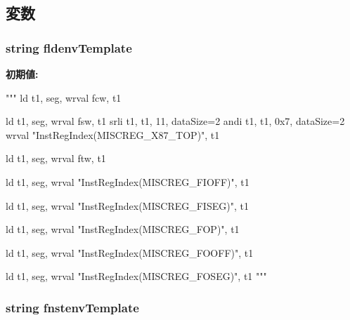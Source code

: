 \subsection{変数}
\hypertarget{namespaceinsts_1_1x87_1_1control_1_1save__and__restore__x87__environment_a644e1745a1988b0b33eaa88f57b12275}{
\subsubsection[{fldenvTemplate}]{\setlength{\rightskip}{0pt plus 5cm}string {\bf fldenvTemplate}}}
\label{namespaceinsts_1_1x87_1_1control_1_1save__and__restore__x87__environment_a644e1745a1988b0b33eaa88f57b12275}
{\bfseries 初期値:}
\begin{DoxyCode}
"""
    ld t1, seg, %
    wrval fcw, t1

    ld t1, seg, %
    wrval fsw, t1
    srli t1, t1, 11, dataSize=2
    andi t1, t1, 0x7, dataSize=2
    wrval "InstRegIndex(MISCREG_X87_TOP)", t1

    ld t1, seg, %
    wrval ftw, t1

    ld t1, seg, %
    wrval "InstRegIndex(MISCREG_FIOFF)", t1

    ld t1, seg, %
    wrval "InstRegIndex(MISCREG_FISEG)", t1

    ld t1, seg, %
    wrval "InstRegIndex(MISCREG_FOP)", t1

    ld t1, seg, %
    wrval "InstRegIndex(MISCREG_FOOFF)", t1

    ld t1, seg, %
    wrval "InstRegIndex(MISCREG_FOSEG)", t1
"""
\end{DoxyCode}
\hypertarget{namespaceinsts_1_1x87_1_1control_1_1save__and__restore__x87__environment_a6525b04e77de26872497b0caec47c0e7}{
\subsubsection[{fnstenvTemplate}]{\setlength{\rightskip}{0pt plus 5cm}string {\bf fnstenvTemplate}}}
